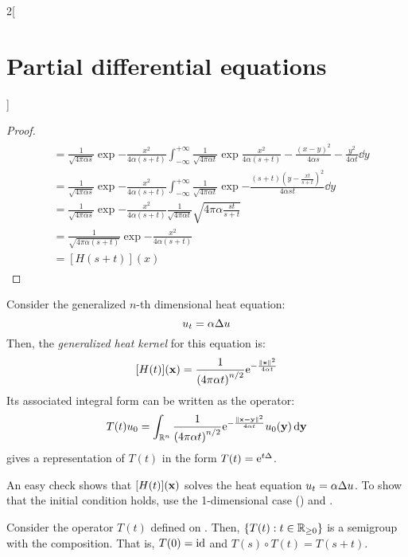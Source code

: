 \documentclass[../../../main_math.tex]{subfiles}
\begin{document}
\begin{multicols}{2}[\section{Partial differential equations}]
\begin{proof}
\begin{multline*}
\begin{aligned}
         & =\frac{1}{\sqrt{4\pi\alpha s}}\exp{-\frac{x^2}{4\alpha (s+t)}}\int_{-\infty}^{+\infty}\frac{1}{\sqrt{4\pi\alpha t}}\exp{\frac{x^2}{4\alpha (s+t)}-\frac{{(x-y)}^2}{4\alpha s}-\frac{y^2}{4\alpha t}}\dd{y} \\
         & =\frac{1}{\sqrt{4\pi\alpha s}}\exp{-\frac{x^2}{4\alpha (s+t)}}\int_{-\infty}^{+\infty}\frac{1}{\sqrt{4\pi\alpha t}}\exp{-\frac{(s+t){\left(y-\frac{xt}{s+t}\right)}^2}{4\alpha st}}\dd{y}                  \\
         & =\frac{1}{\sqrt{4\pi\alpha s}}\exp{-\frac{x^2}{4\alpha (s+t)}}\frac{1}{\sqrt{4\pi\alpha t}}\sqrt{4\pi\alpha \frac{st}{s+t}}                                                                                \\
         & =\frac{1}{\sqrt{4\pi\alpha (s+t)}}\exp{-\frac{x^2}{4\alpha (s+t)}}                                                                                                                                         \\
         & = [H(s+t)](x)
      \end{aligned}
    \end{multline*}
  \end{proof}
  \begin{proposition}
    Consider the generalized $n$-th dimensional heat equation:
    \begin{equation}
      u_t=\alpha\Delta u
    \end{equation} Then, the \emph{generalized heat kernel} for this equation is: $$[H(t)](\boldsymbol{\mathrm{x}}) = \frac{1}{{(4\pi\alpha t)}^{n/2}}\mathrm{e}^{-\frac{\left\|\boldsymbol{\mathrm{x}}\right\|^2}{4\alpha t}}$$ Its associated integral form can be written as the operator:
    \begin{equation}\label{PDE:Toperator}
      T(t)u_0=\int_{\mathbb{R}^n}\frac{1}{{(4\pi\alpha t)}^{n/2}}\mathrm{e}^{-\frac{\left\|\boldsymbol{\mathrm{x-y}}\right\|^2}{4\alpha t}}u_0(\boldsymbol{\mathrm{y}})\dd{\boldsymbol{\mathrm{y}}}
    \end{equation}
     gives a representation of $T(t)$ in the form $T(t)=\mathrm{e}^{t\Delta}$.
  \end{proposition}
  \begin{sproof}
    An easy check shows that $[H(t)](\boldsymbol{\mathrm{x}})$ solves the heat equation $u_t=\alpha\Delta u$. To show that the initial condition holds, use the 1-dimensional case () and .
  \end{sproof}
  \begin{proposition}
    Consider the operator $T(t)$ defined on . Then, $\{T(t):t\in\mathbb{R}_{\geq 0}\}$ is a semigroup with the composition. That is, $T(0)=\mathrm{id}$ and $T(s)\circ T(t)=T(s+t)$.

\end{proposition}
\end{multicols}
\end{document}

